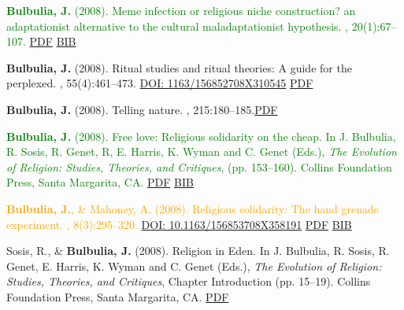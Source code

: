 \documentclass{article}
\begin{document}
\begin{thebibliography}{99}
 \textcolor{Green}{{\bf Bulbulia, J.} (2008).
\newblock Meme infection or religious niche construction? an adaptationist
  alternative to the cultural maladaptationist hypothesis.
, 20(1):67--107.} \href{http://db.tt/6IjKsQV}{PDF} \href{https://scholar.google.co.nz/scholar.bib?q=info:7ZPnl0WG0EkJ:scholar.google.com/&output=citation&scisig=AAGBfm0AAAAAVQSUw7EcGrYvW0TZ0foofELIVjbg3S2W&scisf=4&hl=en}{BIB}


{\bf Bulbulia, J.} (2008).
\newblock Ritual studies and ritual theories: A guide for the perplexed.
, 55(4):461--473.  
\href{https://doi.org/1163/156852708X310545}{DOI: 1163/156852708X310545} \href{http://booksandjournals.brillonline.com/content/journals/10.1163/156852708x310545}{PDF}


{\bf Bulbulia, J.} (2008).
\newblock Telling nature.
, 215:180--185.\href{http://db.tt/MCbgvBt}{PDF}


\textcolor{Green}{
{\bf Bulbulia, J.} (2008).
\newblock Free love: Religious solidarity on the cheap.
\newblock In J. Bulbulia, R. Sosis, R. Genet, R, E. Harris, K. Wyman and
  C. Genet (Eds.), {\em The Evolution of Religion: Studies, Theories, and
  Critiques}, (pp. 153--160). Collins Foundation Press, Santa
  Margarita, CA.} \href{http://db.tt/8vbZ8wQ}{PDF}  \href{https://www.dropbox.com/s/57zbcpj8llfrlgy/freeLove.bib?dl=0}{BIB}
  

\textcolor{Orange}{
{\bf Bulbulia, J.}, \& Mahoney, A. (2008).
\newblock Religious solidarity: The hand grenade experiment.
, 8(3):295--320.
\href{https://doi.org/10.1163/156853708X358191}{DOI: 10.1163/156853708X358191} \newblock} \href{http://db.tt/0969FhI}{PDF} \href{https://scholar.google.co.nz/scholar.bib?q=info:ez_RmJh3ov8J:scholar.google.com/&output=citation&scisig=AAGBfm0AAAAAVQSZK_McRldG-i1APaLH3OkcaGDXrgxr&scisf=4&hl=en}{BIB}


Sosis, R., \& {\bf Bulbulia, J.} (2008).
\newblock Religion in Eden.
\newblock In J. Bulbulia, R. Sosis, R. Genet, E. Harris, K. Wyman and
  C. Genet (Eds.), {\em The Evolution of Religion: Studies, Theories, and
  Critiques}, Chapter Introduction (pp. 15--19). Collins Foundation Press,
  Santa Margarita, CA. \href{http://db.tt/nSs5qqb}{PDF}




\end{thebibliography}
\end{document}
